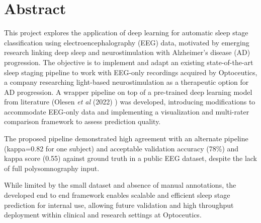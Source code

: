 \section*{Abstract}

This project explores the application of deep learning for automatic sleep stage classification using electroencephalography (EEG) data, motivated by emerging research linking deep sleep and neurostimulation with Alzheimer's disease (AD) progression. The objective is to implement and adapt an existing state-of-the-art sleep staging pipeline to work with EEG-only recordings acquired by Optoceutics, a company researching light-based neurostimulation as a therapeutic option for AD progression. 
A wrapper pipeline on top of a pre-trained deep learning model from literature (Olesen \textit{et al} (2022) \cite{Alexander2020}) was developed, introducing modifications to accommodate EEG-only data and implementing a visualization and multi-rater comparison framework to assess prediction quality.

The proposed pipeline demonstrated high agreement with an alternate pipeline (kappa=0.82 for one subject) and acceptable validation accuracy (78\%) and kappa score (0.55) against ground truth in a public EEG dataset, despite the lack of full polysomnography input. 

While limited by the small dataset and absence of manual annotations, the developed end to end framework enables scalable and efficient sleep stage prediction for internal use, allowing future validation and high throughput deployment within clinical and research settings at Optoceutics.

